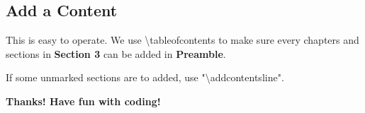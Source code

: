 \documentclass[12pt, letterpaper]{article}
\begin{document}
\begin{spacing}{1.3}
\section{Add a Content}
This is easy to operate. We use \textbackslash tableofcontents to make sure every chapters and sections in \textbf{Section 3} can be added in \textbf{Preamble}.

If some unmarked sections are to added, use "\textbackslash addcontentsline".

\end{spacing}
\begin{center}
    \Huge
    \textbf{Thanks! Have fun with coding!}
\end{center}
\end{document}

